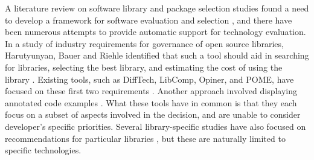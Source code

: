 A literature review on software library and package selection studies found a need to develop a framework for software evaluation and selection \cite{jadhav2009review}, and there have been numerous attempts to provide automatic support for technology evaluation.
In a study of industry requirements for governance of open source libraries, Harutyunyan, Bauer and Riehle identified that such a tool should aid in searching for libraries, selecting the best library, and estimating the cost of using the library \cite{harutyunyan:2018:understanding}. 
Existing tools, such as DiffTech, LibComp, Opiner, and POME, have focused on these first two requirements \cite{huang2018tell, wang2020difftech, wang2021difftech,de2018library, de2018empirical, el2020libcomp,uddin2019automatic, uddin2022empirical,lin2019pattern}. 
Another approach involved displaying annotated code examples \cite{yan2022concept}. What these tools have in common is that they each focus on a subset of aspects involved in the decision, and are unable to consider developer's specific priorities. Several library-specific studies have also focused on recommendations for particular libraries \cite{moataz2020android-reco,he2021migration}, but these are naturally limited to specific technologies.




